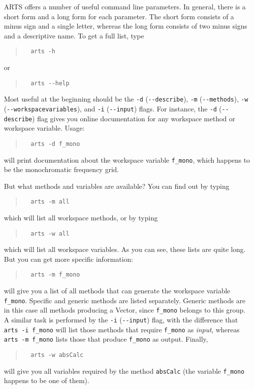 ARTS offers a number of useful command line parameters. In general,
there is a short form and a long form for each parameter. The short
form consists of a minus sign and a single letter, whereas the long
form consists of two minus signs and a descriptive name. To get a full
list, type
\begin{quote}
\begin{verbatim}
  arts -h
\end{verbatim}
\end{quote}
or
\begin{quote}
\begin{verbatim}
  arts --help
\end{verbatim}
\end{quote}
Most useful at the beginning should be the \verb|-d|
(\verb|--describe|), \verb|-m| (\verb|--methods|), \verb|-w|
(\verb|--workspacevariables|), and \verb|-i| (\verb|--input|) flags.
For instance, the \verb|-d| (\verb|--describe|) flag gives you online
documentation for any workspace method or workspace variable. Usage:
\begin{quote}
\begin{verbatim}
  arts -d f_mono
\end{verbatim}
\end{quote}
will print documentation about the workspace variable \verb|f_mono|, which
happens to be the monochromatic frequency grid.

But what methods and variables are available? You can find out by
typing
\begin{quote}
\begin{verbatim}
  arts -m all
\end{verbatim}
\end{quote}
which will list all workspace methods, or by typing 
\begin{quote}
\begin{verbatim}
  arts -w all
\end{verbatim}
\end{quote}
which will list all workspace variables. As you can see, these lists
are quite long. But you can get more specific information:
\begin{quote}
\begin{verbatim}
  arts -m f_mono
\end{verbatim}
\end{quote}
will give you a list of all methods that can generate the workspace
variable \verb|f_mono|. Specific and generic methods are listed
separately. Generic methods are in this case all methods producing a
Vector, since \verb|f_mono| belongs to this group. A similar task is
performed by the \verb|-i| (\verb|--input|) flag, with the difference
that \verb|arts -i f_mono| will list those methods that require
\verb|f_mono| as \emph{input}, whereas \verb|arts -m f_mono| lists
those that produce \verb|f_mono| as output. Finally,
\begin{quote}
\begin{verbatim}
  arts -w absCalc
\end{verbatim}
\end{quote}
will give you all variables required by the method \verb|absCalc|
(the variable \verb|f_mono| happens to be one of them).

